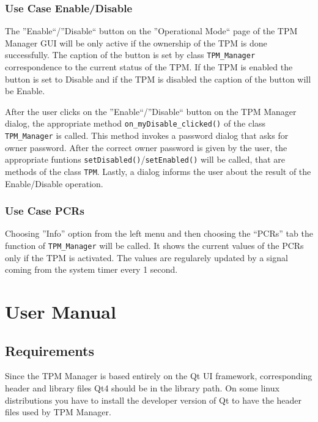 \documentclass[
  american        %
]{sirrixreport}
\begin{document}
\subsection{Use Case Enable/Disable}
The ''Enable``/''Disable`` button on the ''Operational Mode`` page of the TPM Manager GUI will be only active if the ownership of the TPM is done successfully. The caption of the button is set by class \lstinline'TPM_Manager' correspondence to the current status of the TPM. If the TPM is enabled the button is set to Disable and if the TPM is disabled the caption of the button will be Enable.

After the user clicks on the ''Enable``/''Disable`` button on the TPM Manager dialog, the appropriate method \lstinline'on_myDisable_clicked()' of the class \lstinline'TPM_Manager' is called. This method invokes a password dialog that asks for owner password. After the correct owner password is given by the user, the appropriate funtions \lstinline'setDisabled()'/\lstinline'setEnabled()' will be called, that are methods of the class \lstinline'TPM'. Lastly, a dialog informs the user about the result of the Enable/Disable operation.

\subsection{Use Case PCRs}
Choosing ''Info'' option from the left menu and then choosing the ``PCRs'' tab the function of \lstinline'TPM_Manager' will be called. It shows the current values of the PCRs only if the TPM is activated. The values are regularely updated by a signal coming from the system timer every 1 second. 

\chapter{User Manual}

\section{Requirements}
Since the TPM Manager is based entirely on the Qt UI framework, corresponding header 
and library files Qt4 should be in the library path. On some linux distributions you have 
to install the developer version of Qt to have the header files used by TPM Manager. 
\end{document}

